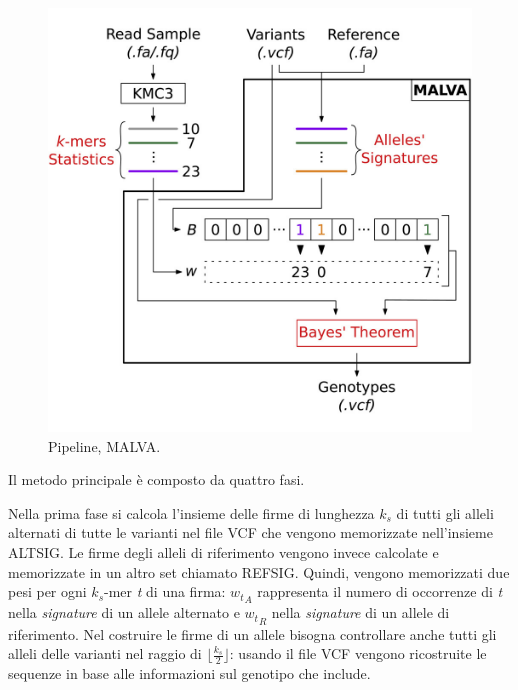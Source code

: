 \documentclass[../main.tex]{subfiles}
\begin{document}
 \begin{figure}[h!]
	\centering
  	\captionsetup{justification=centering}
  	\includegraphics[scale=.90]{images/malva-pipeline.jpg}
  	\caption{Pipeline, MALVA.}
  	\label{fig:malva}
\end{figure}

Il metodo principale è composto da quattro fasi.

Nella prima fase si calcola l'insieme delle firme di lunghezza \textit{${k}_{s}$} di tutti gli alleli alternati di tutte le varianti nel file VCF che vengono memorizzate nell'insieme ALTSIG. Le firme degli alleli di riferimento vengono invece calcolate e memorizzate in un altro set chiamato REFSIG. Quindi, vengono memorizzati due pesi per ogni \textit{${k}_{s}$}-mer \textit{t} di una firma: \textit{${w_{t}}_{A}$} rappresenta il numero di occorrenze di \textit{t} nella \textit{signature} di un allele alternato e \textit{${w_{t}}_{R}$} nella \textit{signature} di un allele di riferimento. Nel costruire le firme di un allele bisogna controllare anche tutti gli alleli delle varianti nel raggio di $\lfloor \frac{ {{{k}_{s}} }}{2}  \rfloor$: usando il file VCF vengono ricostruite le sequenze in base alle informazioni sul genotipo che include. 
\end{document}
